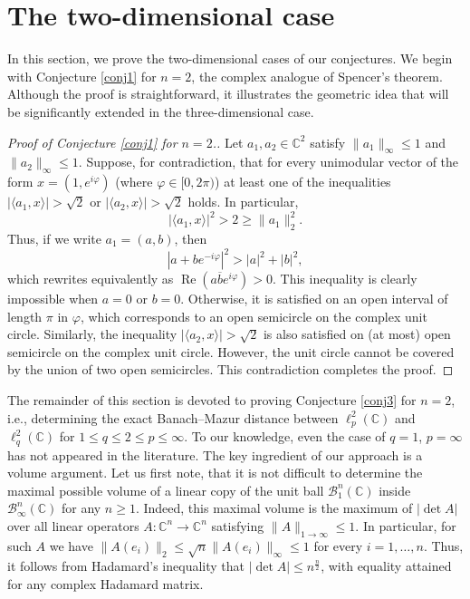 \documentclass[12pt, a4paper]{article}
\theoremstyle{plain} %
\theoremstyle{definition} %
\theoremstyle{remark} %
\DeclareMathOperator{\re}{Re}
\begin{document}
\section{The two-dimensional case}
\label{sec2d}

In this section, we prove the two-dimensional cases of our conjectures. We begin with Conjecture \ref{conj1} for $n=2$, the complex analogue of Spencer's theorem. Although the proof is straightforward, it illustrates the geometric idea that will be significantly extended in the three-dimensional case.


\begin{proof}[Proof of Conjecture \ref{conj1} for $n=2$.]
Let $a_1, a_2 \in \mathbb{C}^2$ satisfy $\|a_1\|_{\infty} \leq 1$ and  $\|a_2\|_{\infty} \leq 1$. Suppose, for contradiction, that for every unimodular vector of the form $x = (1, e^{i \varphi})$ (where $\varphi \in [0, 2\pi)$) at least one of the inequalities $|\langle a_1, x \rangle| > \sqrt{2}$ or $|\langle a_2, x \rangle| > \sqrt{2}$ holds. In particular,
$$|\langle a_1, x \rangle |^2 > 2 \geq \|a_1\|^2_2.$$ 
Thus, if we write $a_1=(a, b)$, then
$$|a + b e^{-i \varphi}|^2 > |a|^2 + |b|^2,$$
which rewrites equivalently as $\re(a\overline{b} e^{i \varphi}) > 0$. This inequality is clearly impossible when $a=0$ or $b=0$. Otherwise, it is satisfied on an open interval of length $\pi$ in $\varphi$, which corresponds to an open semicircle on the complex unit circle. Similarly, the inequality $|\langle a_2, x \rangle| > \sqrt{2}$ is also satisfied on (at most) open semicircle on the complex unit circle. However, the unit circle cannot be covered by the union of two open semicircles. This contradiction completes the proof.
\end{proof}

The remainder of this section is devoted to proving Conjecture \ref{conj3} for $n=2$, i.e., determining the exact Banach--Mazur distance between $\ell^2_p(\mathbb{C})$ and $\ell^2_q(\mathbb{C})$ for $1 \leq q \leq 2 \leq p \leq \infty$. To our knowledge, even the case of $q=1$, $p=\infty$ has not appeared in the literature. The key ingredient of our approach is a volume argument. Let us first note, that it is not difficult to determine the maximal possible volume of a linear copy of the unit ball $\mathcal{B}_1^n(\mathbb{C})$ inside $\mathcal{B}_{\infty}^n(\mathbb{C})$ for any $n \geq 1$. Indeed, this maximal volume is the maximum of $|\det A|$ over all linear operators $A: \mathbb{C}^n \to \mathbb{C}^n$ satisfying $\|A\|_{1 \to \infty} \leq 1$.  In particular, for such $A$ we have $\|A(e_i)\|_2 \leq \sqrt{n} \|A(e_i)\|_{\infty} \leq 1$ for every $i=1, \ldots, n$. Thus, it follows from Hadamard's inequality that $|\det A| \leq n^{\frac{n}{2}}$, with equality attained for any complex Hadamard matrix.
\end{document}
